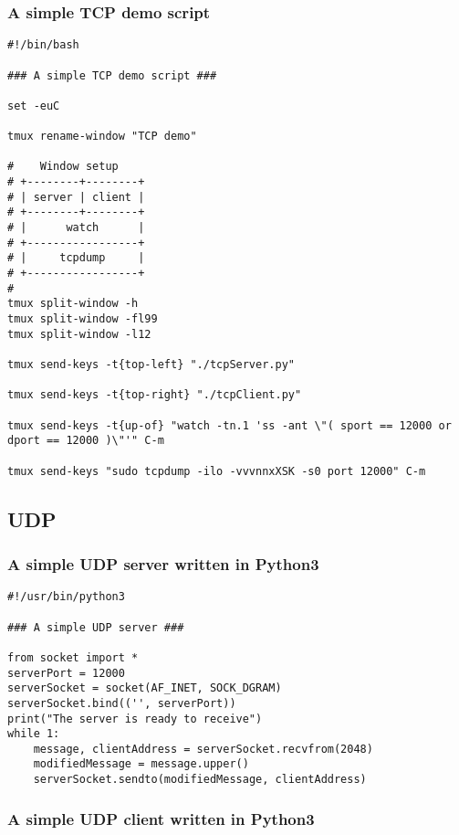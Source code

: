 \documentclass{article}
\begin{document}
\subsubsection{A simple TCP demo script}
\label{sec:orgfc84ea5}

\begin{verbatim}
#!/bin/bash

### A simple TCP demo script ###

set -euC

tmux rename-window "TCP demo"

#    Window setup
# +--------+--------+
# | server | client |
# +--------+--------+
# |      watch      |
# +-----------------+
# |     tcpdump     |
# +-----------------+
#
tmux split-window -h
tmux split-window -fl99
tmux split-window -l12

tmux send-keys -t{top-left} "./tcpServer.py" 

tmux send-keys -t{top-right} "./tcpClient.py"

tmux send-keys -t{up-of} "watch -tn.1 'ss -ant \"( sport == 12000 or dport == 12000 )\"'" C-m

tmux send-keys "sudo tcpdump -ilo -vvvnnxXSK -s0 port 12000" C-m
\end{verbatim}

\subsection{UDP}
\label{sec:orga187657}

\subsubsection{A simple UDP server written in Python3}
\label{sec:org05f4664}

\begin{verbatim}
#!/usr/bin/python3

### A simple UDP server ###

from socket import *
serverPort = 12000
serverSocket = socket(AF_INET, SOCK_DGRAM)
serverSocket.bind(('', serverPort))
print("The server is ready to receive")
while 1:
    message, clientAddress = serverSocket.recvfrom(2048)
    modifiedMessage = message.upper()
    serverSocket.sendto(modifiedMessage, clientAddress)
\end{verbatim}

\subsubsection{A simple UDP client written in Python3}
\label{sec:org2fe842a}
\end{document}
